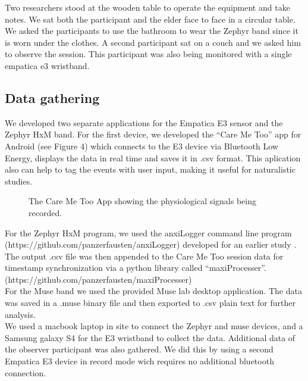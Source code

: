 Two researchers stood at the wooden table to
operate the equipment and take notes. We sat both
the participant and the elder face to face in a circular 
table. We asked the participants to use the bathroom to
wear the Zephyr band since it is worn under the clothes.
A second participant sat on a couch and we asked him to
observe the session. This participant was also being monitored
with a single empatica e3 wristband.

\subsection{Data gathering}
We developed two separate applications for the Empatica
E3 sensor and the Zephyr HxM band.
For the first device, we developed the 
``Care Me Too''  app for Android (see Figure 4) 
which connects to the E3 device via Bluetooth Low Energy,
displays the data in real time and saves it in .csv format. 
This aplication also can help to tag the events with user
input, making it useful for naturalistic studies.



\begin{figure}[h]
        \centering
        \caption{The Care Me Too App showing the physiological signals being recorded.}\label{fig:img_caremetoo}
\end{figure}

For the Zephyr HxM program, we used the anxiLogger
command line program (https://github.com/panzerfausten/anxiLogger) 
developed for an earlier study \cite{Miranda}.
The output .csv file was then appended to the Care Me Too
session data for timestamp synchronization
via a python library called ``maxiProcesser''.
(https://github.com/panzerfausten/maxiProcesser)
\\
For the Muse band we used the provided Muse lab
desktop application. The data was saved in a .muse
binary file and then exported to .csv plain text for
further analysis.
\\
We used a macbook laptop in site to connect the Zephyr
and muse devices, and a Samsung galaxy S4 for the E3
wristband to collect the data. Additional data of the
observer participant was also gathered. We did this by 
using a second Empatica E3 device in record mode wich
requires no additional bluetooth connection. 

